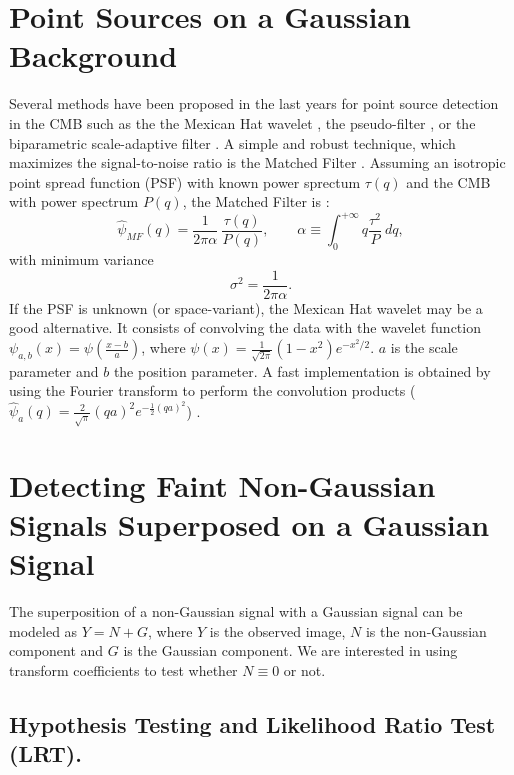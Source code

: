 \section{Point Sources on a Gaussian Background}

Several methods have been proposed in the last years for point source detection in the CMB such as the the Mexican Hat wavelet \cite{gauss:cayon00,gauss:cayon01}, 
the pseudo-filter \cite{gauss:sanz01}, or the biparametric scale-adaptive filter \cite{gauss:sanz05}. A simple and robust technique, which maximizes 
the signal-to-noise ratio is the Matched Filter \cite{gauss:vio02}. Assuming an isotropic point spread function (PSF) with known power sprectum $\tau(q)$ 
and the CMB with power spectrum $P(q)$, the Matched Filter is \cite{gauss:vio02}:
\begin{equation} 
\label{eqn_mf}
\widehat{\psi}_{MF}(q) = \frac{1}{2 \pi \alpha}~ \frac{\tau(q)}{P(q)},\qquad \alpha \equiv \int_0^{+\infty}q \frac{\tau^2}{P} ~dq,
\end{equation}
with minimum variance
\begin{equation} 
\sigma^2 = \frac{1}{2 \pi \alpha}.
\end{equation}
If the PSF is unknown (or space-variant), the Mexican Hat wavelet may be a good alternative. It consists of convolving the data 
with the wavelet function $\psi_{a,b} (x) =  \psi(\frac{x-b}{a})$, where $\psi(x)= \frac{1}{\sqrt{2\pi}}(1 - x^2) e^{- x^2/2}$. 
$a$ is the scale parameter and $b$ the position parameter. A fast implementation is obtained by using the Fourier transform to 
perform the convolution products ($\widehat{\psi}_{a}(q) = \frac{2}{\sqrt{\pi}} {(q a )}^2 e^{- \frac{1}{2}{(q a)}^2}$) \cite{gauss:sanz05}.




\section{Detecting Faint Non-Gaussian Signals Superposed on a Gaussian Signal}
\label{sec:Theory}
The superposition of a non-Gaussian signal with a Gaussian signal can be modeled as $Y = N + G$, where $Y$ is the observed image, 
$N$ is the non-Gaussian component and $G$ is the Gaussian component. We are interested in using transform coefficients to test 
whether $N \equiv 0$ or not.  

\subsection{Hypothesis Testing and Likelihood Ratio Test (LRT).}  
\label{subsec:LRT}

